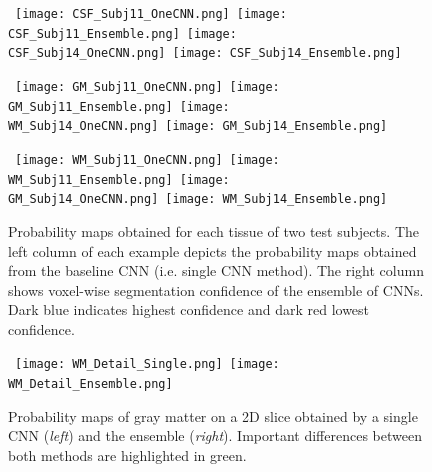 \documentclass[twoside,espcrc2]{elsarticle}
\begin{document}
\begin{figure}[ht!]
\mbox{
        \texttt{[image: CSF\_Subj11\_OneCNN.png]}
        \hspace{-2.25 mm}
        \texttt{[image: CSF\_Subj11\_Ensemble.png]}
        \hspace{-.25 mm}
        \texttt{[image: CSF\_Subj14\_OneCNN.png]}
        \hspace{-2.25 mm}
        \texttt{[image: CSF\_Subj14\_Ensemble.png]}
        }
             
        \vspace{1mm}
        
         \mbox{
        \texttt{[image: GM\_Subj11\_OneCNN.png]}
        \hspace{-2.25 mm}
        \texttt{[image: GM\_Subj11\_Ensemble.png]}
        \hspace{-.25 mm}
        \texttt{[image: WM\_Subj14\_OneCNN.png]}
        \hspace{-2.25 mm}
        \texttt{[image: GM\_Subj14\_Ensemble.png]}
        }
        
        \vspace{1mm}
        
      \mbox{
        \texttt{[image: WM\_Subj11\_OneCNN.png]}
        \hspace{-2.25 mm}
        \texttt{[image: WM\_Subj11\_Ensemble.png]}
        \hspace{-.25 mm}
        \texttt{[image: GM\_Subj14\_OneCNN.png]}
        \hspace{-2.25 mm}
        \texttt{[image: WM\_Subj14\_Ensemble.png]}
        }  
\caption{Probability maps obtained for each tissue of two test subjects. The left column of each example depicts the probability maps obtained from the baseline CNN (i.e. single CNN method). The right column shows voxel-wise segmentation confidence of the ensemble of CNNs. Dark blue indicates highest confidence and dark red lowest confidence.}
\label{fig:probMaps}
\end{figure}

\begin{figure}[ht!]
\begin{center}
     \mbox{
        \texttt{[image: WM\_Detail\_Single.png]}
        \texttt{[image: WM\_Detail\_Ensemble.png]}
        }
\caption{Probability maps of gray matter on a 2D slice obtained by a single CNN (\textit{left}) and the ensemble (\textit{right}). Important differences between both methods are highlighted in green.}
\label{fig:probMapsGM}
\end{center}
\end{figure}
\end{document}

